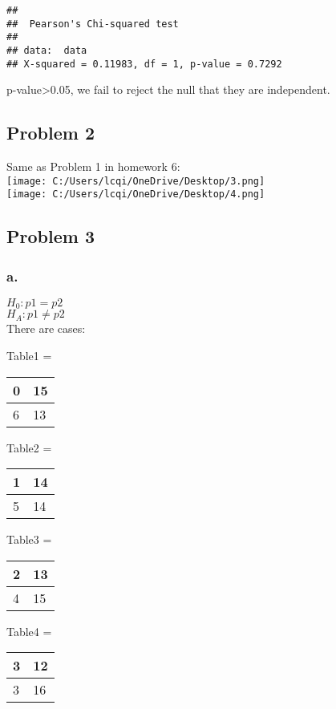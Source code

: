 \documentclass[]{article}
\begin{document}
\begin{verbatim}
## 
##  Pearson's Chi-squared test
## 
## data:  data
## X-squared = 0.11983, df = 1, p-value = 0.7292
\end{verbatim}

p-value\textgreater{}0.05, we fail to reject the null that they are
independent.

\subsection{Problem 2}\label{problem-2}

Same as Problem 1 in homework 6:\\
\texttt{[image: C:/Users/lcqi/OneDrive/Desktop/3.png]}\\
\texttt{[image: C:/Users/lcqi/OneDrive/Desktop/4.png]}

\subsection{Problem 3}\label{problem-3}

\subsubsection{a.}\label{a.-1}

\(H_0: p1=p2\)\\
\(H_A: p1\neq p2\)\\
There are cases:

Table1 =

\begin{longtable}[]{@{}ll@{}}
\toprule
0 & 15\tabularnewline
\midrule
\endhead
6 & 13\tabularnewline
\bottomrule
\end{longtable}

Table2 =

\begin{longtable}[]{@{}ll@{}}
\toprule
1 & 14\tabularnewline
\midrule
\endhead
5 & 14\tabularnewline
\bottomrule
\end{longtable}

Table3 =

\begin{longtable}[]{@{}ll@{}}
\toprule
2 & 13\tabularnewline
\midrule
\endhead
4 & 15\tabularnewline
\bottomrule
\end{longtable}

Table4 =

\begin{longtable}[]{@{}ll@{}}
\toprule
3 & 12\tabularnewline
\midrule
\endhead
3 & 16\tabularnewline
\bottomrule
\end{longtable}
\end{document}
